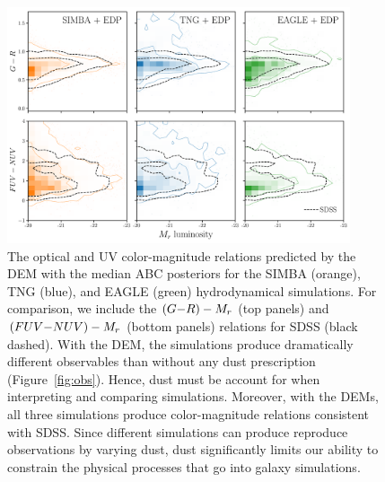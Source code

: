 \begin{figure}
\begin{center}
    \includegraphics[width=0.9\textwidth]{figs/abc_observables.pdf}
    \caption{\label{fig:dem}
    The optical and UV color-magnitude relations predicted by the DEM with 
    the median ABC posteriors for the SIMBA (orange), TNG (blue), and EAGLE
    (green) hydrodynamical simulations. For comparison, we include the 
    $(G{-}R) - M_r$ (top panels) and $(FUV{-}NUV) - M_r$ (bottom panels) relations
    for SDSS (black dashed). With the DEM, the simulations produce dramatically 
    different observables than without any dust prescription (Figure~\ref{fig:obs}). 
    Hence, dust must be account for when interpreting and comparing simulations.
    Moreover, with the DEMs, all three simulations produce color-magnitude
    relations consistent with SDSS. Since different simulations can 
    produce reproduce observations by varying dust, dust significantly limits
    our ability to constrain the physical processes that go into galaxy
    simulations. 
    }
\end{center}
\end{figure}




